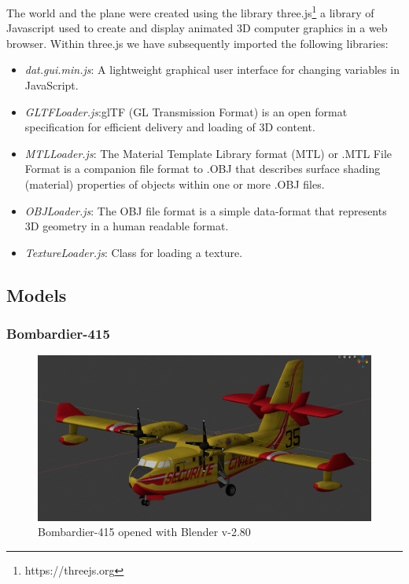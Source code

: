 \documentclass{article}
\begin{document}
The world and the plane were created using the library three.js\footnote{https://threejs.org} a library of Javascript used to create and display animated 3D computer graphics in a web browser. Within three.js we have subsequently imported the following libraries:
\begin{itemize}
\item \textit{dat.gui.min.js}: A lightweight graphical user interface for changing variables in JavaScript.
\item \textit{GLTFLoader.js}:glTF (GL Transmission Format) is an open format specification for efficient delivery and loading of 3D content.
\item \textit{MTLLoader.js}: The Material Template Library format (MTL) or .MTL File Format is a companion file format to .OBJ that describes surface shading (material) properties of objects within one or more .OBJ files.
\item \textit{OBJLoader.js}: The OBJ file format is a simple data-format that represents 3D geometry in a human readable format.
\item \textit{TextureLoader.js}: Class for loading a texture.
\end{itemize}

\subsection*{Models}

\subsubsection*{Bombardier-415}

\begin{figure}[h!]
  \includegraphics[width=\linewidth]{ImmaginiReport/Canadaircomplete.png}
  \caption{Bombardier-415 opened with Blender v-2.80}
\end{figure}
 
\end{document}
